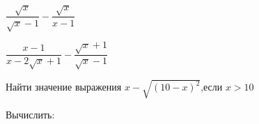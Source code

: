 \begin{listofex}
	\begin{enumcols}[itemcolumns=3]
		\item \( \dfrac{\sqrt{x}}{\sqrt{x}-1}-\dfrac{\sqrt{x}}{x-1} \) 
		\item \( \dfrac{x-1}{x-2\sqrt{x}+1}-\dfrac{\sqrt{x}+1}{\sqrt{x}-1} \) 
	\end{enumcols}
	\item Найти значение выражения \( x-\sqrt{(10-x)^2} \),\quad если \( x>10 \) 
	\item Вычислить:
	\begin{enumcols}[itemcolumns=2]
		\item {}
		\item {}
	\end{enumcols}
\end{listofex}

